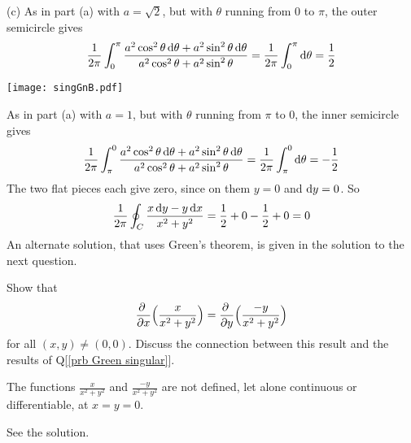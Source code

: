 \begin{solution}
(c)
As in part (a) with $a=\sqrt{2}$, but with $\theta$ running from $0$ to $\pi$, 
the outer semicircle gives 
\begin{equation*}
\frac{1}{2\pi}\int_0^{\pi} \frac{a^2\cos^2\theta\,\mathrm{d}\theta+a^2\sin^2\theta\,\mathrm{d}\theta}
             {a^2\cos^2\theta+a^2\sin^2\theta}
=\frac{1}{2\pi}\int_0^{\pi}\mathrm{d}\theta
=\frac{1}{2}
\end{equation*}
\begin{center}
       \texttt{[image: singGnB.pdf]}
\end{center}
As in part (a) with $a=1$, but with $\theta$ running from $\pi$ to $0$, 
the inner semicircle
gives 
\begin{equation*}
\frac{1}{2\pi}\int^0_{\pi} \frac{a^2\cos^2\theta\,\mathrm{d}\theta+a^2\sin^2\theta\,\mathrm{d}\theta}
             {a^2\cos^2\theta+a^2\sin^2\theta}
=\frac{1}{2\pi}\int^0_{\pi}\mathrm{d}\theta
=-\frac{1}{2}
\end{equation*}
The two flat pieces each give zero, since
on them $y=0$ and $\mathrm{d}y=0$. So 
\begin{equation*}
\frac{1}{2\pi}\oint_C \frac{x\,\mathrm{d}y-y\,\mathrm{d}x}{x^2+y^2}
=\frac{1}{2}+0-\frac{1}{2}+0=0
\end{equation*}
An alternate solution, that uses Green's theorem, is given in the solution to the next question.
\end{solution}

\begin{question}
Show that
\begin{align*}
\pdiff{}{x}\Big( \frac{x}{x^2+y^2}\Big)
=\pdiff{}{y}\Big( \frac{-y}{x^2+y^2}\Big)
\end{align*}
for all $(x,y)\ne (0,0)$. Discuss the connection between this result and
the results of Q[\ref{prb Green singular}].
\end{question}

\begin{hint} 
The functions $\frac{x}{x^2+y^2}$
and $\frac{-y}{x^2+y^2}$ are not defined, let alone continuous or
differentiable, at $x=y=0$.
\end{hint}

\begin{answer} 
See the solution.
\end{answer}

